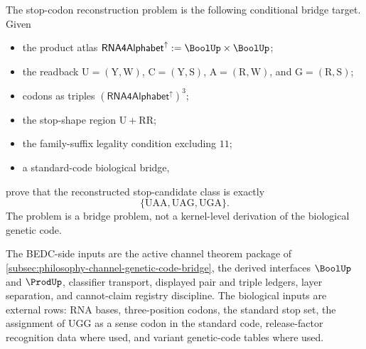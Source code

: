 \begin{definition}
\label{def:philosophy-conditional-stop-codon-reconstruction-problem}
The stop-codon reconstruction problem is the following conditional
bridge target. Given
\begin{itemize}
  \item the product atlas
    $\mathsf{RNA4Alphabet}^{\uparrow}:=\BoolUp\times\BoolUp$;
  \item the readback
    $\mathrm{U}=(\mathrm{Y},\mathrm{W})$,
    $\mathrm{C}=(\mathrm{Y},\mathrm{S})$,
    $\mathrm{A}=(\mathrm{R},\mathrm{W})$, and
    $\mathrm{G}=(\mathrm{R},\mathrm{S})$;
  \item codons as triples
    $(\mathsf{RNA4Alphabet}^{\uparrow})^{3}$;
  \item the stop-shape region
    $\mathrm{U}+\mathrm{RR}$;
  \item the family-suffix legality condition excluding $11$;
  \item a standard-code biological bridge,
\end{itemize}
prove that the reconstructed stop-candidate class is exactly
$$
  \{\mathrm{UAA},\mathrm{UAG},\mathrm{UGA}\}.
$$
The problem is a bridge problem, not a kernel-level derivation of the
biological genetic code.
\end{definition}

\begin{definition}
\label{def:philosophy-zterm-research-inputs}
The BEDC-side inputs are the active channel theorem package of
\autoref{subsec:philosophy-channel-genetic-code-bridge}, the derived
interfaces $\BoolUp$ and $\ProdUp$, classifier transport, displayed pair
and triple ledgers, layer separation, and cannot-claim registry
discipline. The biological inputs are external rows: RNA bases,
three-position codons, the standard stop set, the assignment of
$\mathrm{UGG}$ as a sense codon in the standard code, release-factor
recognition data where used, and variant genetic-code tables where used.
\end{definition}

